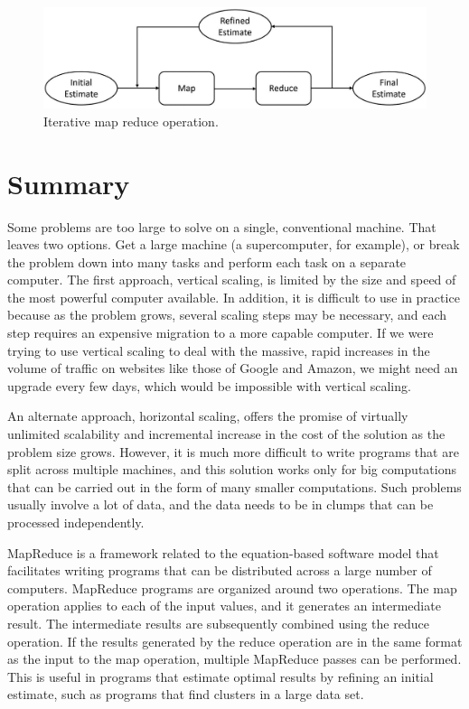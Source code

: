 \begin{figure}
    \begin{center}
        \includegraphics[scale=1]{images-cmyk/iterative-map-reduce-rev}
    \end{center}
    \caption{Iterative map reduce operation.}
    \label{iterative-map-reduce}
\end{figure}

\section{Summary}

Some problems are too large to solve on a single, conventional machine.
That leaves two options.
Get a large machine (a supercomputer, for example),
or break the problem down into many tasks and
perform each task on a separate computer.
The first approach,
vertical scaling,
is limited by the size and speed of the most powerful computer available.
In addition, it is difficult to use in practice because as the problem grows,
several scaling steps may be necessary,
and each step requires an expensive migration to a more capable computer.
If we were trying to use vertical scaling to deal with the massive,
rapid increases in the volume of traffic on websites
like those of Google and Amazon,
we might need an upgrade every few days,
which would be impossible with vertical scaling.

An alternate approach,
horizontal scaling,
offers the promise of virtually unlimited
scalability and incremental increase
in the cost of the solution as the problem size grows.
However, it is much more difficult
to write programs that are split across multiple machines,
and this solution works only
for big computations that can be carried out
in the form of many smaller computations.
Such problems usually involve a lot of data,
and the data needs to be in clumps
that can be processed independently.

MapReduce
is a framework related
to the equation-based software model that facilitates writing
programs that can be distributed across a large number of computers.
MapReduce programs are organized around two operations.
The map operation applies to each of the input values, and
it generates an intermediate result.
The intermediate results are subsequently combined using the reduce operation.
If the results generated by the reduce operation are in the same format
as the input to the map operation, multiple MapReduce passes can be performed.
This is useful in programs that estimate optimal results by refining an initial estimate,
such as programs that find clusters in a large data set.

